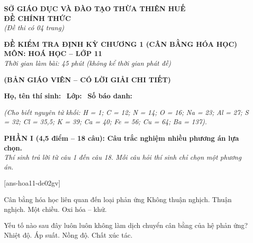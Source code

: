 \documentclass[12pt,a4paper]{article}
\begin{document}
\thispagestyle{firstpage}

\noindent
\begin{minipage}[t]{0.44\textwidth}
	\centering\fontsize{10pt}{12pt}\selectfont
	\textbf{SỞ GIÁO DỤC VÀ ĐÀO TẠO THỪA THIÊN HUẾ}\\
	\textbf{ĐỀ CHÍNH THỨC}\\
	\textit{(Đề thi có 04 trang)}
\end{minipage}\hfill
\begin{minipage}[t]{0.54\textwidth}
	\centering\small
	\textbf{ĐỀ KIỂM TRA ĐỊNH KỲ CHƯƠNG 1 (CÂN BẰNG HÓA HỌC)}\\
	\textbf{MÔN: HOÁ HỌC -- LỚP 11}\\
	\textit{Thời gian làm bài: 45 phút (không kể thời gian phát đề)}\\
\end{minipage}

\smallskip
\begin{center}
	{\color{hfRed}\textbf{\large (BẢN GIÁO VIÊN -- CÓ LỜI GIẢI CHI TIẾT)}}
\end{center}

\smallskip
\noindent\hrulefill
\smallskip

\noindent\textbf{Họ, tên thí sinh:} \dotfill\ \textbf{Lớp:} \dotfill\ \textbf{Số báo danh:} \dotfill

\smallskip
\noindent\textit{(Cho biết nguyên tử khối: H = 1; C = 12; N = 14; O = 16; Na = 23; Al = 27; S = 32; Cl = 35,5; K = 39; Ca = 40; Fe = 56; Cu = 64; Ba = 137).}
\smallskip

\noindent
\textbf{PHẦN I (4,5 điểm -- 18 câu): Câu trắc nghiệm nhiều phương án lựa chọn.}\\
\textit{Thí sinh trả lời từ câu 1 đến câu 18. Mỗi câu hỏi thí sinh chỉ chọn một phương án.}

[ans-hoa11-de02gv]

\begin{ex}
Cân bằng hóa học liên quan đến loại phản ứng
\choice
{Không thuận nghịch.}
{\True Thuận nghịch.}
{Một chiều.}
{Oxi hóa – khử.}
\end{ex}

\begin{ex}
Yếu tố nào sau đây luôn luôn không làm dịch chuyển cân bằng của hệ phản ứng?
\choice
{Nhiệt độ.}
{Áp suất.}
{Nồng độ.}
{\True Chất xúc tác.}
\end{ex}
\end{document}
